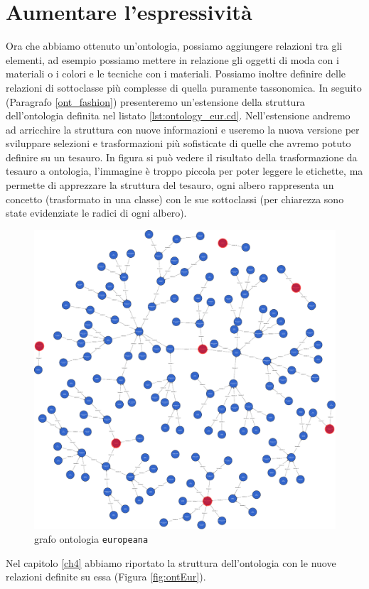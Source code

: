\section{Aumentare l'espressività}\label{expr}
Ora che abbiamo ottenuto un'ontologia, possiamo aggiungere relazioni tra gli elementi, ad esempio possiamo mettere in relazione gli oggetti di moda con i materiali o i colori e le tecniche con i materiali. Possiamo inoltre definire delle relazioni di sottoclasse più complesse di quella puramente tassonomica.  In seguito (Paragrafo \ref{ont_fashion}) presenteremo un'estensione della struttura dell'ontologia definita nel listato \ref{lst:ontology_eur.cd}. Nell'estensione andremo ad arricchire la struttura con nuove informazioni e useremo la nuova versione per sviluppare selezioni e trasformazioni più sofisticate di quelle che avremo potuto definire su un tesauro. In figura si può vedere il risultato della trasformazione da tesauro a ontologia, l'immagine è troppo piccola per poter leggere le etichette, ma permette di apprezzare la struttura del tesauro, ogni albero rappresenta un concetto (trasformato in una classe) con le sue sottoclassi (per chiarezza sono state evidenziate le radici di ogni albero).
\begin{figure}[H]
	\centering
	\includegraphics[width=\textwidth]{Picture/europeana_tree.pdf}
	 \caption[Caption for LOF]{grafo ontologia \texttt{europeana}\footnotemark}
\end{figure}
Nel capitolo \ref{ch4} abbiamo riportato la struttura dell'ontologia con le nuove relazioni definite su essa (Figura \ref{fig:ontEur}).

